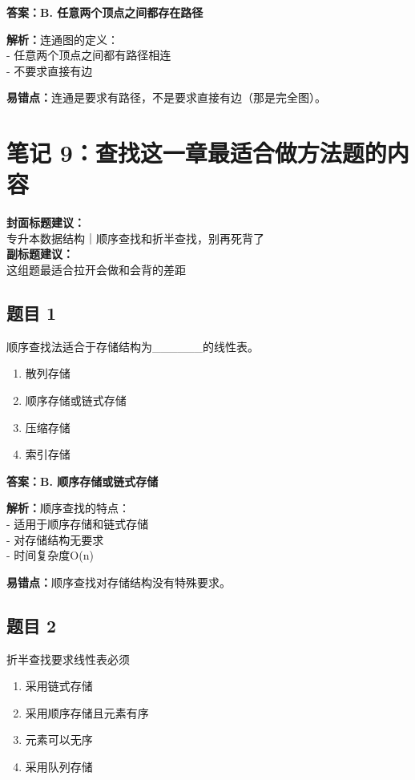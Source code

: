 \documentclass[12pt,a4paper]{ctexart}
\begin{document}
\begin{answerbox}
	\textbf{答案：B. 任意两个顶点之间都存在路径}

	\textbf{解析：}连通图的定义：\\
	- 任意两个顶点之间都有路径相连\\
	- 不要求直接有边

	\textbf{易错点：}连通是要求有路径，不是要求直接有边（那是完全图）。
\end{answerbox}

\newpage

\section{笔记 9：查找这一章最适合做方法题的内容}
\begin{coverbox}
	\textbf{封面标题建议：}\\
	专升本数据结构｜顺序查找和折半查找，别再死背了\\
	\textbf{副标题建议：}\\
	这组题最适合拉开会做和会背的差距
\end{coverbox}

\subsection*{题目 1}
顺序查找法适合于存储结构为\_\_\_\_\_\_的线性表。
\begin{enumerate}[label=\Alph*.]
	\item 散列存储
	\item 顺序存储或链式存储
	\item 压缩存储
	\item 索引存储
\end{enumerate}

\begin{answerbox}
	\textbf{答案：B. 顺序存储或链式存储}

	\textbf{解析：}顺序查找的特点：\\
	- 适用于顺序存储和链式存储\\
	- 对存储结构无要求\\
	- 时间复杂度O(n)

	\textbf{易错点：}顺序查找对存储结构没有特殊要求。
\end{answerbox}

\subsection*{题目 2}
折半查找要求线性表必须
\begin{enumerate}[label=\Alph*.]
	\item 采用链式存储
	\item 采用顺序存储且元素有序
	\item 元素可以无序
	\item 采用队列存储
\end{enumerate}
\end{document}

